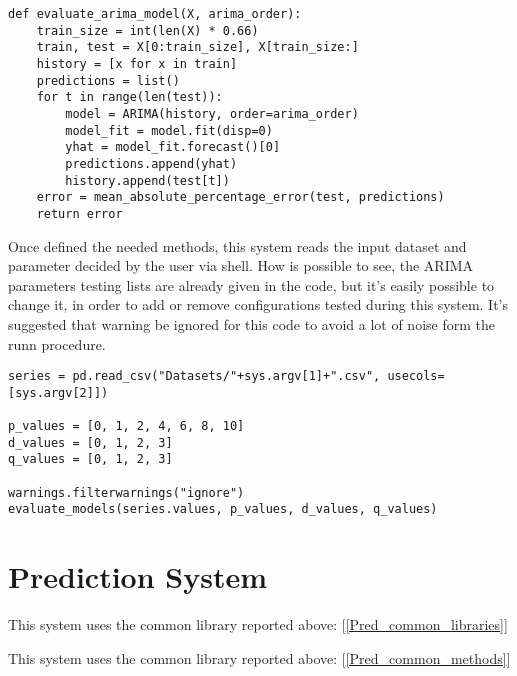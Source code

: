 \begin{lstlisting}
def evaluate_arima_model(X, arima_order):
	train_size = int(len(X) * 0.66)
	train, test = X[0:train_size], X[train_size:]
	history = [x for x in train]
	predictions = list()
	for t in range(len(test)):
		model = ARIMA(history, order=arima_order)
		model_fit = model.fit(disp=0)
		yhat = model_fit.forecast()[0]
		predictions.append(yhat)
		history.append(test[t])
	error = mean_absolute_percentage_error(test, predictions)
	return error
\end{lstlisting}

Once defined the needed methods, this system reads the input dataset and parameter decided by the user via shell. How is possible to see, the ARIMA parameters testing lists are already given in the code, but it's easily possible to change it, in order to add or remove configurations tested during this system.
It's suggested that warning be ignored for this code to avoid a lot of noise form the runn procedure. 
\begin{lstlisting}
series = pd.read_csv("Datasets/"+sys.argv[1]+".csv", usecols=[sys.argv[2]])

p_values = [0, 1, 2, 4, 6, 8, 10]
d_values = [0, 1, 2, 3]
q_values = [0, 1, 2, 3]

warnings.filterwarnings("ignore")
evaluate_models(series.values, p_values, d_values, q_values)
\end{lstlisting}

\newpage

\section{Prediction System}
\label{Prediction_System}
This system uses the common library reported above: [\ref{Pred_common_libraries}]

This system uses the common library reported above: [\ref{Pred_common_methods}] \\

